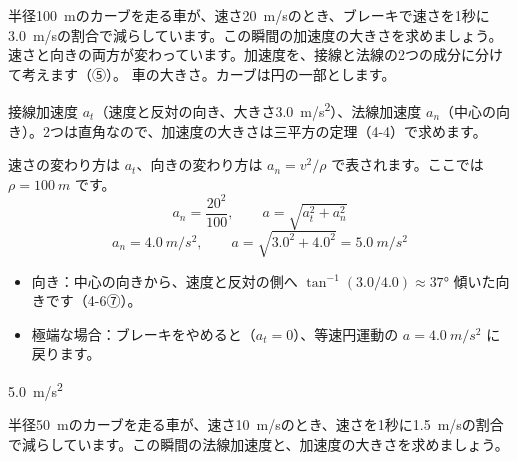 \begin{phreidai}[ブレーキをかけながら曲がる]
\label{ph:力-1:ex10}半径\qty{100}{m}のカーブを走る車が、速さ\qty{20}{m/s}のとき、ブレーキで速さを1秒に\qty{3.0}{m/s}の割合で減らしています。この瞬間の加速度の大きさを求めましょう。
\phbamen
速さと向きの両方が変わっています。加速度を、接線と法線の2つの成分に分けて考えます（⑤）。
\phmushi
車の大きさ。カーブは円の一部とします。
\phzu
\noindent\begin{minipage}[c]{0.42\linewidth}\centering
{}
\end{minipage}\hfill
\begin{minipage}[c]{0.55\linewidth}
接線加速度 $a_t$（速度と反対の向き、大きさ\qty{3.0}{m/s^2}）、法線加速度 $a_n$（中心の向き）。2つは直角なので、加速度の大きさは三平方の定理（4-4）で求めます。
\end{minipage}
\phriyu
速さの変わり方は $a_t$、向きの変わり方は $a_n=v^2/\rho$ で表されます。ここでは $\rho=\qty{100}{m}$ です。
\phtateru
\[ a_n=\frac{20^2}{100},\qquad a=\sqrt{a_t^2+a_n^2} \]
\phtoku
\[ a_n=\qty{4.0}{m/s^2},\qquad a=\sqrt{3.0^2+4.0^2}=\qty{5.0}{m/s^2} \]
\phtashikame
\begin{itemize}[leftmargin=1.2\zw, itemsep=1pt, topsep=1pt, label={\color{bkTheme}●}]
\item 向き：中心の向きから、速度と反対の側へ $\tan^{-1}(3.0/4.0)\approx37°$ 傾いた向きです（4-6⑦）。
\item 極端な場合：ブレーキをやめると（$a_t=0$）、等速円運動の $a=\qty{4.0}{m/s^2}$ に戻ります。
\end{itemize}
\kotae \qty{5.0}{m/s^2}
\end{phreidai}
\begin{jibun}
半径\qty{50}{m}のカーブを走る車が、速さ\qty{10}{m/s}のとき、速さを1秒に\qty{1.5}{m/s}の割合で減らしています。この瞬間の法線加速度と、加速度の大きさを求めましょう。
\end{jibun}


